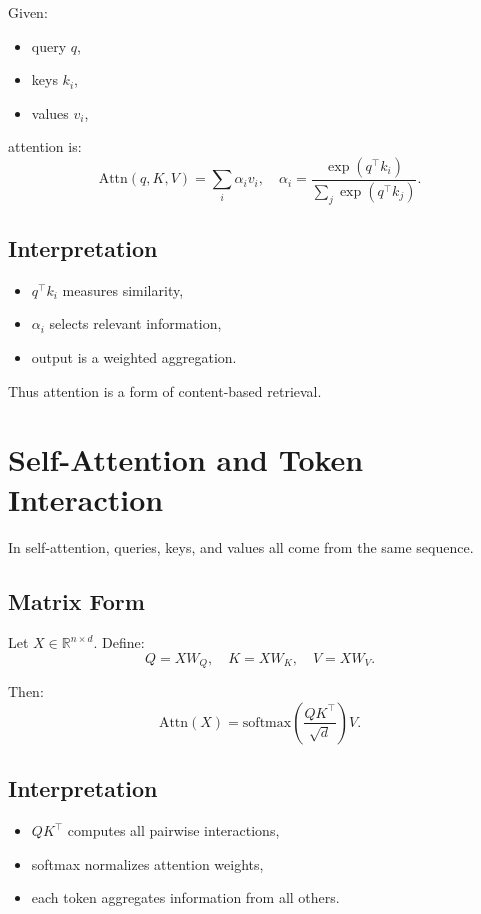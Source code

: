 Given:
\begin{itemize}
    \item query $q$,
    \item keys $k_i$,
    \item values $v_i$,
\end{itemize}
attention is:
\[
\mathrm{Attn}(q, K, V)
=
\sum_i \alpha_i v_i,
\quad
\alpha_i = \frac{\exp(q^\top k_i)}{\sum_j \exp(q^\top k_j)}.
\]

\subsection{Interpretation}

\begin{itemize}
    \item $q^\top k_i$ measures similarity,
    \item $\alpha_i$ selects relevant information,
    \item output is a weighted aggregation.
\end{itemize}

Thus attention is a form of content-based retrieval.

\section{Self-Attention and Token Interaction}

In self-attention, queries, keys, and values all come from the same sequence.

\subsection{Matrix Form}

Let $X \in \mathbb{R}^{n \times d}$. Define:
\[
Q = X W_Q,\quad K = X W_K,\quad V = X W_V.
\]

Then:
\[
\mathrm{Attn}(X)
=
\mathrm{softmax}\!\left(\frac{QK^\top}{\sqrt{d}}\right)V.
\]

\subsection{Interpretation}

\begin{itemize}
    \item $QK^\top$ computes all pairwise interactions,
    \item softmax normalizes attention weights,
    \item each token aggregates information from all others.
\end{itemize}

